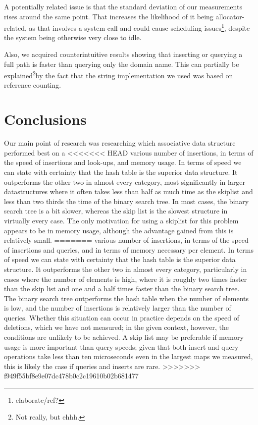 \documentclass[12pt,a4paper]{article}
\begin{document}
    A potentially related issue is that the standard deviation of our measurements rises around the
    same point.  That increases the likelihood of it being allocator-related, as that involves a
    system call and could cause scheduling issues\footnote{elaborate/ref?}, despite the system being
    otherwise very close to idle.

    Also, we acquired counterintuitive results showing that inserting or querying a full path is
    faster than querying only the domain name.  This can partially be explained\footnote{Not really,
    but ehhh.}by the fact that the string implementation we used was based on reference counting.


    \section{Conclusions}
    Our main point of research was researching which associative data structure performed best on a
<<<<<<< HEAD
    various number of insertions, in terms of the speed of insertions and look-ups, and memory
    usage.  In terms of speed we can state with certainty that the hash table is the superior data
    structure.  It outperforms the other two in almost every category, most significantly in larger
    datastructures where it often takes less than half as much time as the skiplist and less than
    two thirds the time of the binary search tree.  In most cases, the binary search tree is a bit
    slower, whereas the skip list is the slowest structure in virtually every case. The only
    motivation for using a skiplist for this problem appears to be in memory usage, although the
    advantage gained from this is relatively small.
=======
    various number of insertions, in terms of the speed of insertions and queries, and in terms of
    memory necessary per element.  In terms of speed we can state with certainty that the hash table
    is the superior data structure.  It outperforms the other two in almost every category,
    particularly in cases where the number of elements is high, where it is roughly two times faster
    than the skip list and one and a half times faster than the binary search tree.  The binary
    search tree outperforms the hash table when the number of elements is low, and the number of
    insertions is relatively larger than the number of queries.  Whether this situation can occur in
    practice depends on the speed of deletions, which we have not measured; in the given context,
    however, the conditions are unlikely to be achieved.  A skip list may be preferable if memory
    usage is more important than query speeds; given that both insert and query operations take less
    than ten microseconds even in the largest maps we measured, this is likely the case if queries
    and inserts are rare.
>>>>>>> f949f55bf8e9e07dc478b0c2c19610b02b681477
\end{document}
